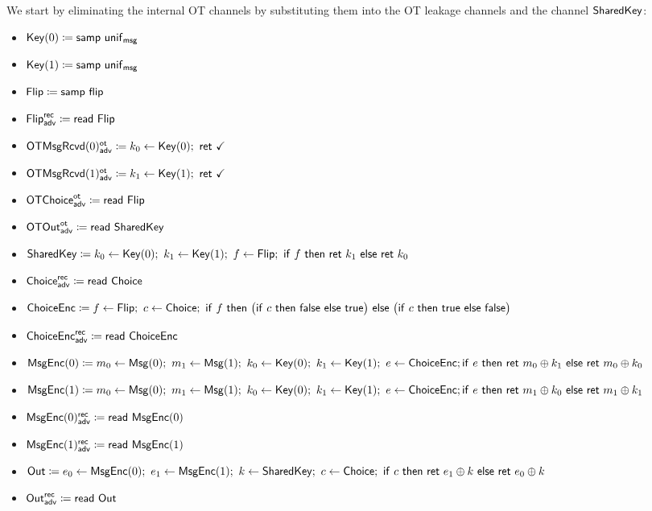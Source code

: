 \noindent We start by eliminating the internal OT channels by substituting them into the OT leakage channels and the channel $\mathsf{SharedKey}$:

\begin{itemize}
\item $\mathsf{Key}(0) \coloneqq \mathsf{samp} \ \mathsf{unif}_{\mathsf{msg}}$
\item $\mathsf{Key}(1) \coloneqq \mathsf{samp} \ \mathsf{unif}_{\mathsf{msg}}$
\item $\mathsf{Flip} \coloneqq \mathsf{samp} \ \mathsf{flip}$
\item {\color{blue} $\mathsf{Flip}^{\mathsf{rec}}_{\mathsf{adv}} \coloneqq \mathsf{read} \ \mathsf{Flip}$}
\item {\color{blue} $\LeakOTMsgRcvd(0)^\ot_\adv \coloneqq k_0 \leftarrow \Key(0); \ \ret{\checkmark}$}
\item {\color{blue} $\LeakOTMsgRcvd(1)^\ot_\adv \coloneqq k_1 \leftarrow \Key(1); \ \ret{\checkmark}$}
\item {\color{blue} $\mathsf{OTChoice}^{\mathsf{ot}}_{\mathsf{adv}} \coloneqq \mathsf{read} \ \mathsf{Flip}$}
\item {\color{blue} $\mathsf{OTOut}^{\mathsf{ot}}_{\mathsf{adv}} \coloneqq \mathsf{read} \ \mathsf{SharedKey}$}
\item $\SharedKey \coloneqq k_0 \leftarrow \Key(0); \ k_1 \leftarrow \Key(1); \ f \leftarrow \Flip; \ \ifte{f}{\ret{k_1}}{\ret{k_0}}$
\item {\color{blue} $\mathsf{Choice}^{\mathsf{rec}}_{\mathsf{adv}} \coloneqq \mathsf{read} \ \mathsf{Choice}$}
\item $\ChoiceEnc \coloneqq f \leftarrow \Flip; \ c \leftarrow \Choice; \ \ifte{f}{\big(\ifte{c}{\false}{\true}\big)}{\big(\ifte{c}{\true}{\false}\big)}$
\item {\color{blue} $\mathsf{ChoiceEnc}^{\mathsf{rec}}_{\mathsf{adv}} \coloneqq \mathsf{read} \ \mathsf{ChoiceEnc}$}
\item $\mathsf{MsgEnc}(0) \coloneqq m_0 \leftarrow \mathsf{Msg}(0); \ m_1 \leftarrow \mathsf{Msg}(1); \ k_0 \leftarrow \mathsf{Key}(0); \ k_1 \leftarrow \mathsf{Key}(1); \ e \leftarrow \mathsf{ChoiceEnc}; \\ \mathsf{if} \ e \ \mathsf{then} \ \mathsf{ret} \ m_0 \oplus k_1 \ \mathsf{else} \ \mathsf{ret} \ m_0 \oplus k_0$
\item $\mathsf{MsgEnc}(1) \coloneqq m_0 \leftarrow \mathsf{Msg}(0); \ m_1 \leftarrow \mathsf{Msg}(1); \ k_0 \leftarrow \mathsf{Key}(0); \ k_1 \leftarrow \mathsf{Key}(1); \ e \leftarrow \mathsf{ChoiceEnc}; \\ \mathsf{if} \ e \ \mathsf{then} \ \mathsf{ret} \ m_1 \oplus k_0 \ \mathsf{else} \ \mathsf{ret} \ m_1 \oplus k_1$
\item {\color{blue} $\mathsf{MsgEnc}(0)^{\mathsf{rec}}_{\mathsf{adv}} \coloneqq \mathsf{read} \ \mathsf{MsgEnc}(0)$}
\item {\color{blue} $\mathsf{MsgEnc}(1)^{\mathsf{rec}}_{\mathsf{adv}} \coloneqq \mathsf{read} \ \mathsf{MsgEnc}(1)$}
\item $\mathsf{Out} \coloneqq e_0 \leftarrow \mathsf{MsgEnc}(0); \ e_1 \leftarrow \mathsf{MsgEnc}(1); \ k \leftarrow \mathsf{SharedKey}; \ c \leftarrow \mathsf{Choice}; \ \mathsf{if} \ c \ \mathsf{then} \ \mathsf{ret} \ e_1 \oplus k \ \mathsf{else} \ \mathsf{ret} \ e_0 \oplus k$
\item {\color{blue} $\mathsf{Out}^{\mathsf{rec}}_{\mathsf{adv}} \coloneqq \mathsf{read} \ \mathsf{Out}$}
\end{itemize}


